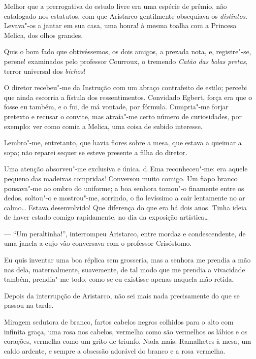 Melhor que a prerrogativa do estudo livre
era uma espécie de prêmio, não catalogado nos estatutos, com que
Aristarco gentilmente obsequiava os \textit{distintos}. Levava"-os a jantar em
sua casa, uma honra! à mesma toalha com a Princesa Melica, dos olhos grandes. 

Quis o bom fado que obtivéssemos, os dois amigos, a prezada
nota, e, registre"-se, perene! examinados pelo professor Courroux, o
tremendo \textit{Catão das bolas pretas}, terror universal dos \textit{bichos}!

O diretor recebeu"-me da Instrução com um abraço contrafeito de estilo; percebi
que ainda escorria a fístula dos ressentimentos. Convidado Egbert,
força era que o fosse eu também, e o fui, de má vontade, por fórmula.
Cumpria"-me forjar pretexto e recusar o convite, mas atraía"-me certo
número de curiosidades, por exemplo: ver como comia a Melica, uma coisa
de subido interesse. 

Lembro"-me, entretanto, que havia flores sobre a
mesa, que estava a queimar a sopa; não reparei sequer se esteve presente 
a filha do diretor. 

Uma atenção absorveu"-me
exclusiva e única. d.\,Ema reconheceu"-me: era aquele pequeno das
madeixas compridas! Conversou muito comigo. Um fiapo branco
pousava"-me ao ombro do uniforme; a boa senhora tomou"-o finamente
entre os dedos, soltou"-o e mostrou"-me, sorrindo, o fio levíssimo a
cair lentamente no ar calmo\ldots{} Estava desenvolvido! Que diferença do
que era há dois anos. Tinha ideia de haver estado comigo rapidamente,
no dia da exposição artística\ldots{} 

--- ``Um peraltinha!'', interrompeu Aristarco, entre mordaz e condescendente, 
de uma janela a cujo vão
conversava com o professor Crisóstomo. 

Eu quis inventar uma boa réplica
sem grosseria, mas a senhora me prendia a mão nas dela, maternalmente,
suavemente, de tal modo que me prendia a vivacidade também,
prendia"-me todo, como se eu existisse apenas naquela mão retida.

Depois da interrupção de Aristarco, não sei mais nada precisamente do
que se passou na tarde. 

Miragem sedutora de branco, fartos cabelos
negros colhidos para o alto com infinita graça, uma rosa nos cabelos,
vermelha como são vermelhos os lábios e os corações, vermelha como um
grito de triunfo. Nada mais. Ramalhetes à mesa, um caldo ardente, e
sempre a obsessão adorável do branco e a rosa vermelha. 

